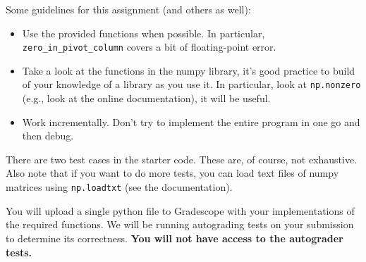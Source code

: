 \documentclass{article}
\theoremstyle{remark}
\begin{document}
Some guidelines for this assignment (and others as well):
\begin{itemize}
\item Use the provided functions when possible. In particular, \texttt{zero\_in\_pivot\_column} covers a bit of floating-point error.
\item Take a look at the functions in the numpy library, it's good practice to build of your knowledge of a library as you use it.
  In particular, look at \texttt{np.nonzero} (e.g., look at the online documentation), it will be useful.
\item Work incrementally. Don't try to implement the entire program in one go and then debug.
\end{itemize}
There are two test cases in the starter code.
These are, of course, not exhaustive.
Also note that if you want to do more tests, you can load text files of numpy matrices using \texttt{np.loadtxt} (see the documentation).

You will upload a single python file to Gradescope with your implementations of the required functions.
We will be running autograding tests on your submission to determine its correctness.
\textbf{You will not have access to the autograder tests.}
\end{document}
